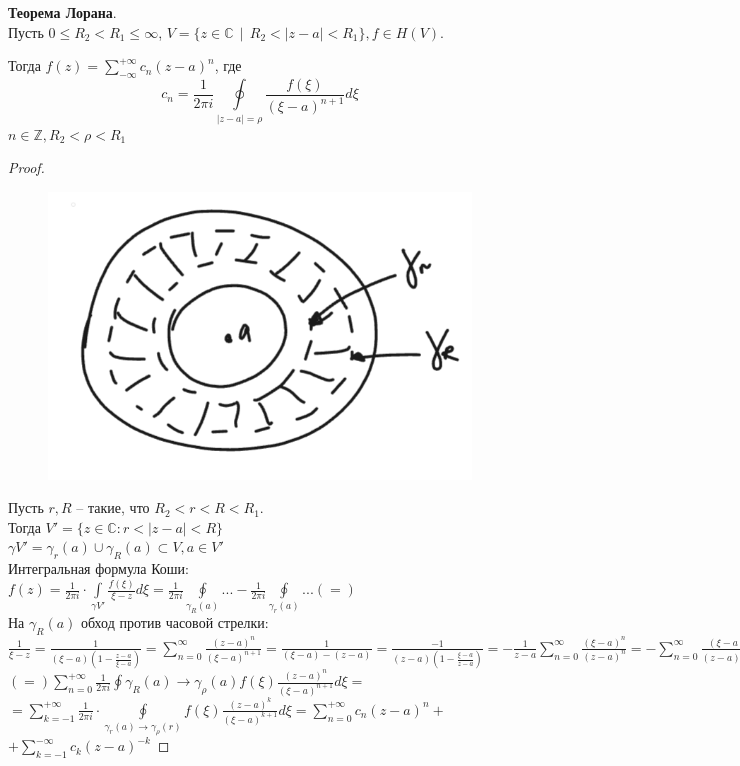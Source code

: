 \textbf{Теорема Лорана}.\\[2mm]
Пусть $0\le R_2 < R_1 \le \infty$, $V = \{z\in\mathbb{C} ~~|~~ R_2 < |z - a| < R_1\}, f\in H(V)$.

Тогда $f(z) = \sum\limits_{-\infty}^{+\infty}c_n (z - a)^n$, где
$$
c_n = \frac{1}{2\pi i}\oint\limits_{|z - a| = \rho} \frac{f(\xi)}{(\xi - a)^{n + 1}} d\xi
$$
$n\in\mathbb{Z}, R_2 < \rho < R_1$

\begin{proof}
    \ \\
    
    \begin{figure}[h]
        \centering
        \includegraphics[width=0.4\linewidth]{answers/img/ans14.png}
    \end{figure}
    Пусть $r, R$ -- такие, что $R_2<r<R<R_1$.\\
    Тогда $V'=\{z\in \mathbb{C}: r<|z-a|<R\}$\\
    $\gamma V'=\gamma_r(a)\cup \gamma_R(a)\subset V, a\in V'$\\
    Интегральная формула Коши: $f(z)=\frac{1}{2\pi i}\cdot \int\limits_{\gamma V'}\frac{f(\xi)}{\xi-z}d\xi = \frac{1}{2\pi i}\oint\limits_{\gamma_R(a)}...-\frac{1}{2\pi i}\oint\limits_{\gamma_r(a)}... (=)$\\
    На $\gamma_R(a)$ обход против часовой стрелки:\\
    $\frac{1}{\xi-z}=\frac{1}{(\xi-a)(1-\frac{z-a}{\xi-a})}=\sum_{n=0}^\infty \frac{(z-a)^n}{(\xi-a)^{n+1}} = \frac{1}{(\xi-a)-(z-a)}=\frac{-1}{(z-a)(1-\frac{\xi-a}{z-a})}=-\frac{1}{z-a}\sum_{n=0}^\infty \frac{(\xi-a)^n}{(z-a)^n}=-\sum_{n=0}^\infty \frac{(\xi-a)^n}{(z-a)^{n+1}} = -\sum_{k=-1}^{-\infty} \frac{(z-a)^k}{(\xi-a)^{k+1}}$\\
    $(=) \sum_{n=0}^{+\infty} \frac{1}{2\pi i} \oint\limits{\gamma_R(a)\to\gamma_\rho(a)}f(\xi) \frac{(z-a)^n}{(\xi-a)^{n+1}}d\xi =$\\
    $=\sum_{k=-1}^{+\infty}\frac{1}{2\pi i}\cdot \oint\limits_{\gamma_r(a)\to \gamma_\rho(r)}f(\xi)\frac{(z-a)^k}{(\xi-a)^{k+1}}d\xi = \sum\limits_{n=0}^{+\infty} c_n(z-a)^n+$\\
    $+\sum_{k=-1}^{-\infty}c_k(z-a)^{-k}$ 
    
\end{proof}

